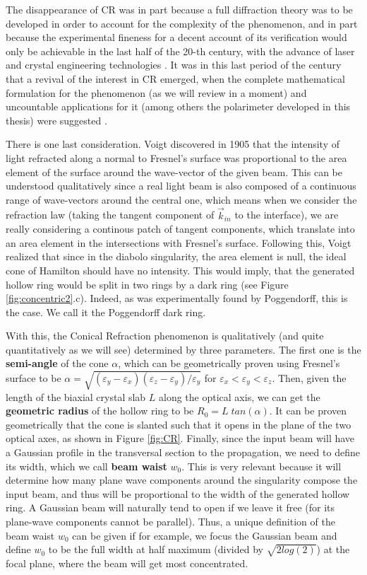 \documentclass[11pt, a4paper, twoside]{article} %
\begin{document}
{The disappearance of CR was in part because a full diffraction theory was to be developed in order to account for the complexity of the phenomenon, and in part because the experimental fineness for a decent account of its verification would only be achievable in the last half of the 20-th century, with the advance of laser and crystal engineering technologies \cite{Todor}. It was in this last period of the century that a revival of the interest in CR emerged, when the complete mathematical formulation for the phenomenon \cite{BK1, BK2, Berry, Jeffrey} (as we will review in a moment) and uncountable applications for it \cite{Turpin} (among others the polarimeter developed in this thesis) were suggested \cite{Stokes1, Stokes2, incomplete}.
}

There is one last consideration. Voigt discovered in 1905 \cite{voigt, Jeffrey} that the intensity of light refracted along a normal to Fresnel's surface was proportional to the area element of the surface around the wave-vector of the given beam. This can be understood qualitatively since a real light beam is also composed of a continuous range of wave-vectors around the central one, which means when we consider the refraction law (taking the tangent component of $\vec{k}_{in}$ to the interface), we are really considering a continous patch of tangent components, which translate into an area element in the intersections with Fresnel's surface. Following this, Voigt realized that since in the diabolo singularity, the area element is null, the ideal cone of Hamilton should have no intensity. This would imply, that the generated hollow ring would be split in two rings by a dark ring (see Figure \ref{fig:concentric2}.c). Indeed, as was experimentally found by Poggendorff, this is the case. We call it the Poggendorff dark ring.

With this, the Conical Refraction phenomenon is qualitatively (and quite quantitatively as we will see) determined by three parameters. The first one is the {\bf semi-angle} of the cone $\alpha$, which can be geometrically proven using Fresnel's surface to be $\alpha=\sqrt{(\varepsilon_y-\varepsilon_x)(\varepsilon_z-\varepsilon_y)/\varepsilon_y}$ for $\varepsilon_x<\varepsilon_y<\varepsilon_z$. Then, given the length of the biaxial crystal slab $L$ along the optical axis, we can get the {\bf geometric radius} of the hollow ring to be $R_0=L\;tan(\alpha)$. It can be proven geometrically that the cone is slanted such that it opens in the plane of the two optical axes, as shown in Figure \ref{fig:CR}. Finally, since the input beam will have a Gaussian profile in the transversal section to the propagation, we need to define its width, which we call {\bf beam waist} $w_0$. This is very relevant because it will determine how many plane wave components around the singularity compose the input beam, and thus will be proportional to the width of the generated hollow ring. A Gaussian beam will naturally tend to open if we leave it free (for its plane-wave components cannot be parallel). Thus, a unique definition of the beam waist $w_0$ can be given if for example, we focus the Gaussian beam and define $w_0$ to be the full width at half maximum (divided by $\sqrt{2log(2)}$) at the focal plane, where the beam will get most concentrated.
\end{document}
